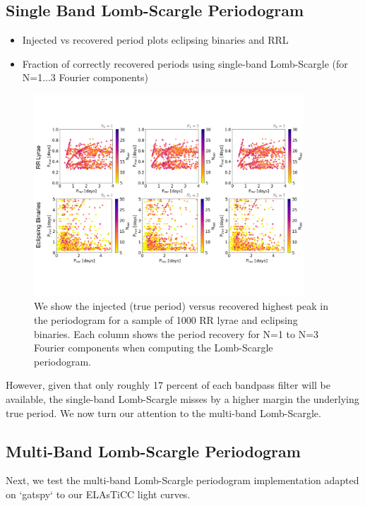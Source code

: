 \documentclass[DM,authoryear,toc]{lsstdoc}
\begin{document}
\subsection{Single Band Lomb-Scargle Periodogram}

\begin{itemize}
\item Injected vs recovered period plots eclipsing binaries and RRL
\item Fraction of correctly recovered periods using single-band Lomb-Scargle (for N=1...3 Fourier components)  
\end{itemize}

\begin{figure}
  \includegraphics[width=0.9\textwidth]{figures/singleband_lsp.pdf}
  \centering 
  \caption{We show the injected (true period) versus recovered highest peak in the periodogram for a sample of 1000 RR lyrae and eclipsing binaries. Each column shows the period recovery for N=1 to N=3 Fourier components when computing the Lomb-Scargle periodogram.}
  \label{fig:comp}
\end{figure}

However, given that only roughly 17 percent of each bandpass filter will be available, the single-band Lomb-Scargle misses by a higher margin the underlying true period. We now turn our attention to the multi-band Lomb-Scargle.

\subsection{Multi-Band Lomb-Scargle Periodogram}

Next, we test the multi-band Lomb-Scargle periodogram implementation adapted on `gatspy` to our ELAsTiCC light curves.
\end{document}
